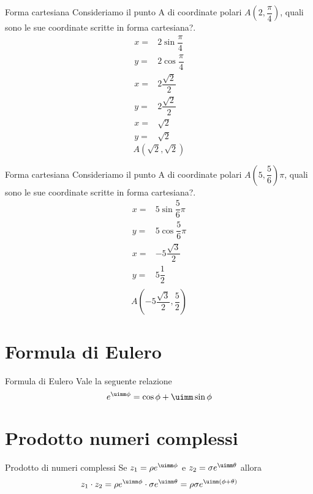 \begin{esempiot}{Forma cartesiana}{} Consideriamo il punto A di coordinate polari $A(2,\dfrac{\pi}{4})$, quali sono le sue coordinate scritte in forma cartesiana?.
	\begin{align*}
	x=&2\sin\dfrac{\pi}{4}\\
	y=&2\cos\dfrac{\pi}{4}\\
	x=&2\dfrac{\sqrt{2}}{2}\\
	y=&2\dfrac{\sqrt{2}}{2}\\
	x=&\sqrt{2}\\
	y=&\sqrt{2}
	\end{align*}
	\[A(\sqrt{2},\sqrt{2}) \]
\end{esempiot}
\begin{esempiot}{Forma cartesiana}{} Consideriamo il punto A di coordinate polari $A(5,\dfrac{5}{6})\pi$, quali sono le sue coordinate scritte in forma cartesiana?.
	\begin{align*}
	x=&5\sin\dfrac{5}{6}\pi\\
	y=&5\cos\dfrac{5}{6}\pi\\
	x=&-5\dfrac{\sqrt{3}}{2}\\
	y=&5\dfrac{1}{2}\\
		\end{align*}
	\[A(-5\dfrac{\sqrt{3}}{2},\dfrac{5}{2}) \]
\end{esempiot}
\section{Formula di Eulero}
\begin{teoremat}{Formula di Eulero}{}
Vale la seguente relazione	\[e^{\uimm\phi}=\cos\phi+\uimm\sin\phi\]
\end{teoremat}
\section{Prodotto numeri complessi}
\begin{teoremat}{Prodotto di numeri complessi}{}
	Se $z_1=\rho e^{\uimm\phi}$  e $z_2=\sigma e^{\uimm\theta}$ allora
	\[z_1\cdot z_2= \rho e^{\uimm\phi}\cdot\sigma e^{\uimm\theta}=\rho\sigma e^{\uimm(\phi+\theta)}\]
\end{teoremat}